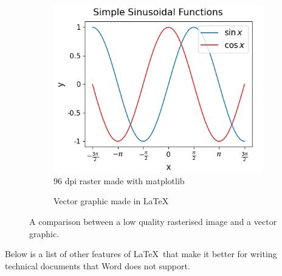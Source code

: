 \begin{figure}[H]
	\begin{subfigure}{0.49\textwidth}
		\includegraphics[width=\textwidth]{example_figure_matplotlib_096.png}
		\caption{96 dpi raster made with matplotlib}
		\label{fig:ExampleRasterImage}
	\end{subfigure}
	\begin{subfigure}{0.49\textwidth}
		\caption{Vector graphic made in \LaTeX}
		\label{fig:ExampleVectorImage}
	\end{subfigure}
	\caption{A comparison between a low quality rasterised image and a vector graphic.}
	\label{fig:ExamplePlots}
\end{figure}

Below is a list of other features of \LaTeX\ that make it better for writing technical documents that Word does not support.

